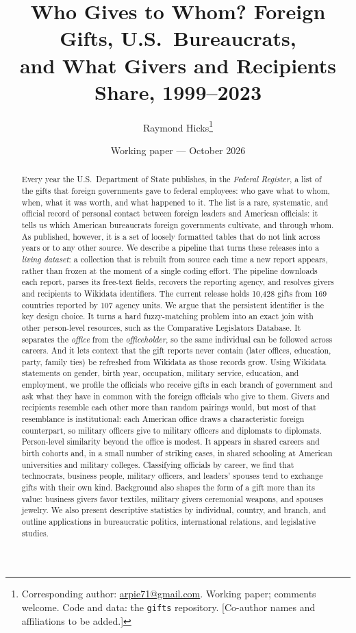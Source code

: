 \documentclass[11pt]{article}
\title{\textbf{Who Gives to Whom? Foreign Gifts, U.S.\ Bureaucrats,}\\
\textbf{and What Givers and Recipients Share, 1999--2023}}
\author{Raymond Hicks\thanks{Corresponding author: \href{mailto:arpie71@gmail.com}{arpie71@gmail.com}. Working paper; comments welcome. Code and data: the \texttt{gifts} repository. [Co-author names and affiliations to be added.]}}
\date{Working paper --- October 2026}
\newcommand{\ngifts}{10,428}
\begin{document}
\maketitle

\begin{abstract}
\noindent Every year the U.S.\ Department of State publishes, in the \emph{Federal Register}, a list of the gifts that foreign governments gave to federal employees: who gave what to whom, when, what it was worth, and what happened to it. The list is a rare, systematic, and official record of personal contact between foreign leaders and American officials: it tells us which American bureaucrats foreign governments cultivate, and through whom. As published, however, it is a set of loosely formatted tables that do not link across years or to any other source. We describe a pipeline that turns these releases into a \emph{living dataset}: a collection that is rebuilt from source each time a new report appears, rather than frozen at the moment of a single coding effort. The pipeline downloads each report, parses its free-text fields, recovers the reporting agency, and resolves givers and recipients to Wikidata identifiers. The current release holds \ngifts{} gifts from 169 countries reported by 107 agency units. We argue that the persistent identifier is the key design choice. It turns a hard fuzzy-matching problem into an exact join with other person-level resources, such as the Comparative Legislators Database. It separates the \emph{office} from the \emph{officeholder}, so the same individual can be followed across careers. And it lets context that the gift reports never contain (later offices, education, party, family ties) be refreshed from Wikidata as those records grow. Using Wikidata statements on gender, birth year, occupation, military service, education, and employment, we profile the officials who receive gifts in each branch of government and ask what they have in common with the foreign officials who give to them. Givers and recipients resemble each other more than random pairings would, but most of that resemblance is institutional: each American office draws a characteristic foreign counterpart, so military officers give to military officers and diplomats to diplomats. Person-level similarity beyond the office is modest. It appears in shared careers and birth cohorts and, in a small number of striking cases, in shared schooling at American universities and military colleges. Classifying officials by career, we find that technocrats, business people, military officers, and leaders' spouses tend to exchange gifts with their own kind. Background also shapes the form of a gift more than its value: business givers favor textiles, military givers ceremonial weapons, and spouses jewelry. We also present descriptive statistics by individual, country, and branch, and outline applications in bureaucratic politics, international relations, and legislative studies.
\end{abstract}
\end{document}
